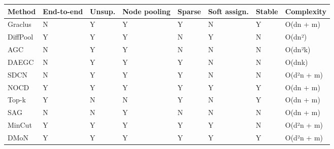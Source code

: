 \begin{longtable}[]{@{}
  >{\raggedright\arraybackslash}p{}
  >{\raggedright\arraybackslash}p{}
  >{\raggedright\arraybackslash}p{}
  >{\raggedright\arraybackslash}p{}
  >{\raggedright\arraybackslash}p{}
  >{\raggedright\arraybackslash}p{}
  >{\raggedright\arraybackslash}p{}
  >{\raggedright\arraybackslash}p{}@{}}
\toprule\noalign{}
\begin{minipage}[b]{\linewidth}\raggedright
Method
\end{minipage} & \begin{minipage}[b]{\linewidth}\raggedright
End-to-end
\end{minipage} & \begin{minipage}[b]{\linewidth}\raggedright
Unsup.
\end{minipage} & \begin{minipage}[b]{\linewidth}\raggedright
Node pooling
\end{minipage} & \begin{minipage}[b]{\linewidth}\raggedright
Sparse
\end{minipage} & \begin{minipage}[b]{\linewidth}\raggedright
Soft assign.
\end{minipage} & \begin{minipage}[b]{\linewidth}\raggedright
Stable
\end{minipage} & \begin{minipage}[b]{\linewidth}\raggedright
Complexity
\end{minipage} \\
\midrule\noalign{}
\endhead
\bottomrule\noalign{}
\endlastfoot
Graclus & N & Y & Y & Y & N & Y & O(dn + m) \\
DiffPool & Y & Y & Y & N & Y & N & O(dn²) \\
AGC & N & Y & Y & N & N & N & O(dn²k) \\
DAEGC & N & Y & Y & Y & N & N & O(dnk) \\
SDCN & N & Y & Y & Y & N & N & O(d²n + m) \\
NOCD & Y & Y & Y & Y & Y & Y & O(dn + m) \\
Top-k & Y & N & N & Y & N & Y & O(dn + m) \\
SAG & N & N & Y & N & N & N & O(dn + m) \\
MinCut & Y & Y & Y & Y & Y & N & O(d²n + m) \\
DMoN & Y & Y & Y & Y & Y & Y & O(d²n + m) \\
\end{longtable}

